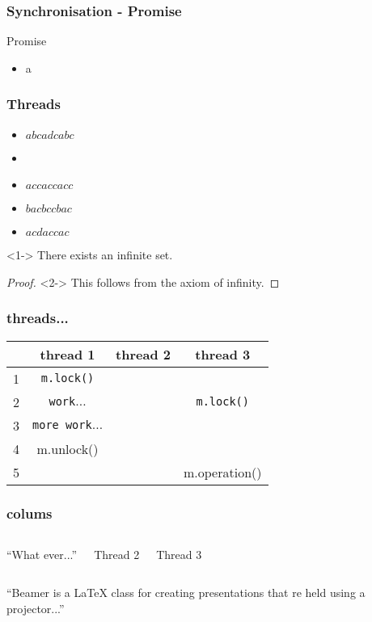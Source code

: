 \documentclass{beamer}
\begin{document}
\begin{frame}[fragile]
\frametitle{Synchronisation - Promise}
Promise
\begin{itemize}
\item a
\end{itemize}
\end{frame}
\begin{frame}
  \frametitle{Threads}
  \begin{itemize}[<+->]
  \item<1> $abcadcabc$
  \item<1-2> 
  \item<1-2> $accaccacc$
  \item<1> $bacbccbac$
  \item<1,3> $acdaccac$
  \end{itemize}
\end{frame}

\begin{frame}
  \begin{theorem}<1->
    There exists an infinite set.
  \end{theorem}

  \begin{proof}<2->
    This follows from the axiom of infinity.
  \end{proof}
\end{frame}

\begin{frame}[fragile]
  \frametitle{threads...}
  \begin{center}
    \begin{tabular}{l|c|c|c}
      &thread 1 & thread 2 & thread 3\\
      \hline
      1&\verb|m.lock()| & &\\
      \hline
      2&\verb|work|$\ldots$& & \verb|m.lock()|\\
      \hline
      3&\verb|more work|$\ldots$&&\\
      \hline
      4&m.unlock() &&\\
      \hline
      5&&&m.operation()
    \end{tabular}
  \end{center}
\end{frame}

\begin{frame}
  \frametitle{colums}
  \begin{columns}[t]
    \begin{block}{}
      ``What ever...''
    \end{block}
    Thread 2

    Thread 3
  \end{columns}
\end{frame}


\begin{frame}
  \begin{block}{}
    ``Beamer is a {\LaTeX} class for creating presentations that re held
    using a projector...''
  \end{block}
\end{frame}
\end{document}
